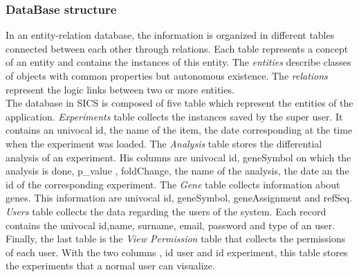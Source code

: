 \documentclass[a4paper]{report}
\begin{document}
\subsubsection{DataBase structure}

In an entity-relation database, the information is organized in different tables connected between each other through relations. Each table represents a concept of an entity and contains the instances of this entity. The \emph{entities} describe classes of objects with common properties but autonomous existence. The \emph{relations} represent the logic links between two or more entities.\\
The database in SICS is composed of five table which represent the entities of the application. \emph{Experiments} table collects the instances saved by the super user. It contains an univocal id, the name of the item, the date corresponding at the time when the experiment was loaded. The \emph{Analysis} table stores the differential analysis of an experiment. His columns are	univocal id, geneSymbol on which the analysis is done, p\_value , foldChange, the name of the analysis, the date an the id of the corresponding experiment. 
The \emph{Gene} table collects information about genes. This information are 	univocal id, geneSymbol, geneAssignment and refSeq.
\emph{Users} table collects the data regarding the users of the system. Each record contains the univocal id,name, surname, email, password and type of an user.
 Finally, the last table is the \emph{View Permission} table that collects the permissions of each user. With the two columns , id user and id experiment, this table stores the experiments that a normal user can visualize.\\
\end{document}

